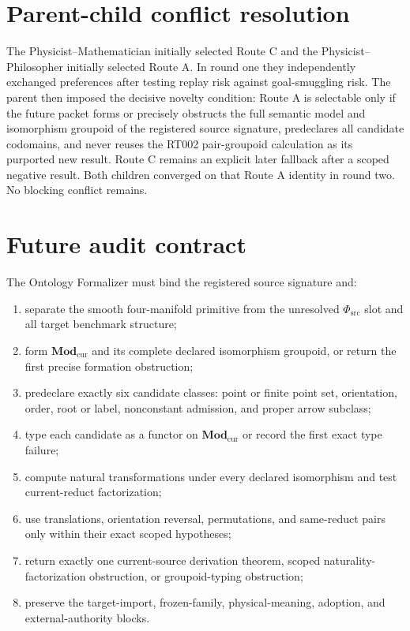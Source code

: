 \documentclass[11pt]{article}
\newcommand{\ModCur}{\mathbf{Mod}_{\mathrm{cur}}}
\begin{document}
\section{Parent-child conflict resolution}

The Physicist--Mathematician initially selected Route C and the
Physicist--Philosopher initially selected Route A.  In round one they
independently exchanged preferences after testing replay risk against
goal-smuggling risk.  The parent then imposed the decisive novelty condition:
Route A is selectable only if the future packet forms or precisely obstructs
the full semantic model and isomorphism groupoid of the registered source
signature, predeclares all candidate codomains, and never reuses the RT002
pair-groupoid calculation as its purported new result.  Route C remains an
explicit later fallback after a scoped negative result.  Both children
converged on that Route A identity in round two.  No blocking conflict remains.

\section{Future audit contract}

The Ontology Formalizer must bind the registered source signature and:
\begin{enumerate}[leftmargin=2em]
  \item separate the smooth four-manifold primitive from the unresolved
        $\Phi_{\mathrm{src}}$ slot and all target benchmark structure;
  \item form $\ModCur$ and its complete declared isomorphism groupoid, or
        return the first precise formation obstruction;
  \item predeclare exactly six candidate classes: point or finite point set,
        orientation, order, root or label, nonconstant admission, and proper
        arrow subclass;
  \item type each candidate as a functor on $\ModCur$ or record the first
        exact type failure;
  \item compute natural transformations under every declared isomorphism and
        test current-reduct factorization;
  \item use translations, orientation reversal, permutations, and same-reduct
        pairs only within their exact scoped hypotheses;
  \item return exactly one current-source derivation theorem, scoped
        naturality-factorization obstruction, or groupoid-typing obstruction;
  \item preserve the target-import, frozen-family, physical-meaning, adoption,
        and external-authority blocks.
\end{enumerate}
\end{document}
